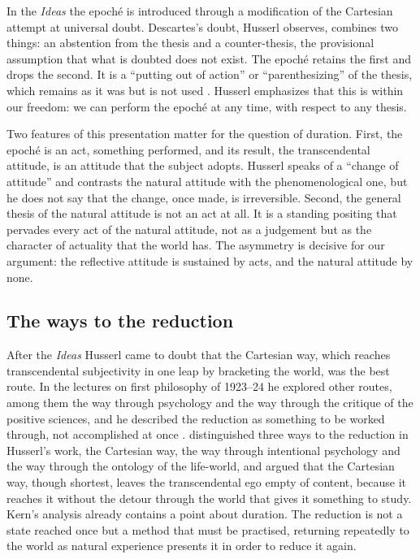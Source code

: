 \documentclass{situationist-preprint}
\begin{document}
In the \emph{Ideas} the epoché is introduced through a modification of the Cartesian attempt at universal doubt. Descartes's doubt, Husserl observes, combines two things: an abstention from the thesis and a counter-thesis, the provisional assumption that what is doubted does not exist. The epoché retains the first and drops the second. It is a \enquote{putting out of action} or \enquote{parenthesizing} of the thesis, which remains as it was but is not used \citep[§§31--32]{Husserl1913}. Husserl emphasizes that this is within our freedom: we can perform the epoché at any time, with respect to any thesis.

Two features of this presentation matter for the question of duration. First, the epoché is an act, something performed, and its result, the transcendental attitude, is an attitude that the subject adopts. Husserl speaks of a \enquote{change of attitude} and contrasts the natural attitude with the phenomenological one, but he does not say that the change, once made, is irreversible. Second, the general thesis of the natural attitude is not an act at all. It is a standing positing that pervades every act of the natural attitude, not as a judgement but as the character of actuality that the world has. The asymmetry is decisive for our argument: the reflective attitude is sustained by acts, and the natural attitude by none.

\subsection{The ways to the reduction}

After the \emph{Ideas} Husserl came to doubt that the Cartesian way, which reaches transcendental subjectivity in one leap by bracketing the world, was the best route. In the lectures on first philosophy of 1923--24 he explored other routes, among them the way through psychology and the way through the critique of the positive sciences, and he described the reduction as something to be worked through, not accomplished at once \citep{Husserl1959}. \citet{Kern1962} distinguished three ways to the reduction in Husserl's work, the Cartesian way, the way through intentional psychology and the way through the ontology of the life-world, and argued that the Cartesian way, though shortest, leaves the transcendental ego empty of content, because it reaches it without the detour through the world that gives it something to study. Kern's analysis already contains a point about duration. The reduction is not a state reached once but a method that must be practised, returning repeatedly to the world as natural experience presents it in order to reduce it again.
\end{document}

